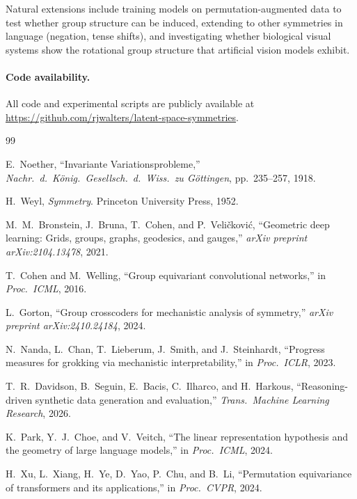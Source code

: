\documentclass[10pt, letterpaper]{article}
\begin{document}
Natural extensions include training models on permutation-augmented data to test whether group structure can be induced, extending to other symmetries in language (negation, tense shifts), and investigating whether biological visual systems show the rotational group structure that artificial vision models exhibit.

\paragraph{Code availability.} All code and experimental scripts are publicly available at \url{https://github.com/rjwalters/latent-space-symmetries}.

\begin{thebibliography}{99}

E.~Noether, ``Invariante Variationsprobleme,'' \textit{Nachr.\ d.\ K\"onig.\ Gesellsch.\ d.\ Wiss.\ zu G\"ottingen}, pp.~235--257, 1918.

H.~Weyl, \textit{Symmetry}. Princeton University Press, 1952.

M.~M.~Bronstein, J.~Bruna, T.~Cohen, and P.~Veli\v{c}kovi\'{c}, ``Geometric deep learning: Grids, groups, graphs, geodesics, and gauges,'' \textit{arXiv preprint arXiv:2104.13478}, 2021.

T.~Cohen and M.~Welling, ``Group equivariant convolutional networks,'' in \textit{Proc.\ ICML}, 2016.

L.~Gorton, ``Group crosscoders for mechanistic analysis of symmetry,'' \textit{arXiv preprint arXiv:2410.24184}, 2024.

N.~Nanda, L.~Chan, T.~Lieberum, J.~Smith, and J.~Steinhardt, ``Progress measures for grokking via mechanistic interpretability,'' in \textit{Proc.\ ICLR}, 2023.

T.~R.~Davidson, B.~Seguin, E.~Bacis, C.~Ilharco, and H.~Harkous, ``Reasoning-driven synthetic data generation and evaluation,'' \textit{Trans.\ Machine Learning Research}, 2026.

K.~Park, Y.~J.~Choe, and V.~Veitch, ``The linear representation hypothesis and the geometry of large language models,'' in \textit{Proc.\ ICML}, 2024.

H.~Xu, L.~Xiang, H.~Ye, D.~Yao, P.~Chu, and B.~Li, ``Permutation equivariance of transformers and its applications,'' in \textit{Proc.\ CVPR}, 2024.


\end{thebibliography}
\end{document}
